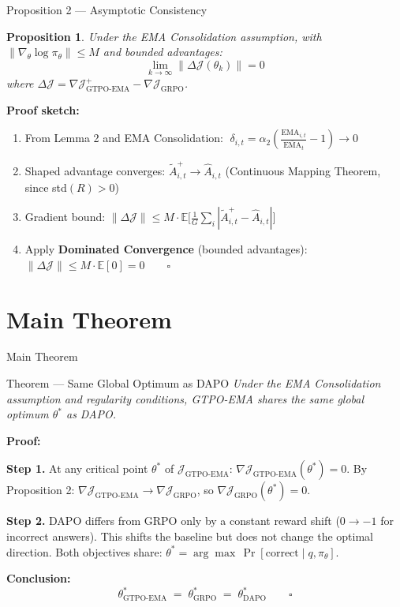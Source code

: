 \documentclass[aspectratio=169, 11pt]{beamer}
\newtheorem{proposition}{Proposition}
\newcommand{\EMA}{\mathrm{EMA}}
\newcommand{\GEMA}{\overline{\mathrm{EMA}}}
\newcommand{\Jgtpo}{\mathcal{J}_{\text{GTPO-EMA}}}
\newcommand{\Jgrpo}{\mathcal{J}_{\text{GRPO}}}
\begin{document}
\begin{frame}{Proposition 2 — Asymptotic Consistency}

\begin{proposition}
Under the EMA Consolidation assumption, with $\|\nabla_\theta \log \pi_\theta\| \leq M$
and bounded advantages:
\[
\lim_{k\to\infty} \|\Delta\mathcal{J}(\theta_k)\| = 0
\]
where $\Delta\mathcal{J} = \nabla\Jgtpo^+ - \nabla\Jgrpo$.
\end{proposition}

\textbf{Proof sketch:}
\begin{enumerate}
  \item From Lemma 2 and EMA Consolidation:
  $\;\delta_{i,t} = \alpha_2\!\left(\tfrac{\EMA_{i,t}}{\GEMA_t} - 1\right) \to 0$

  \item Shaped advantage converges: $\tilde{A}^+_{i,t} \to \hat{A}_{i,t}$
  (Continuous Mapping Theorem, since std$(R) > 0$)

  \item Gradient bound:
  $\|\Delta\mathcal{J}\| \leq M \cdot \mathbb{E}\bigl[\tfrac{1}{G}\sum_i |\tilde{A}^+_{i,t} - \hat{A}_{i,t}|\bigr]$

  \item Apply \textbf{Dominated Convergence} (bounded advantages):
  $\|\Delta\mathcal{J}\| \leq M \cdot \mathbb{E}[0] = 0 \qquad\square$
\end{enumerate}

\end{frame}

\section{Main Theorem}

\begin{frame}{Main Theorem}

\begin{block}{\large Theorem — Same Global Optimum as DAPO}
\emph{Under the EMA Consolidation assumption and regularity conditions,
GTPO-EMA shares the same global optimum $\theta^*$ as DAPO.}
\end{block}

\medskip
\textbf{Proof:}

\textbf{Step 1.} At any critical point $\theta^*$ of $\Jgtpo$:
$\nabla\Jgtpo(\theta^*) = 0$.
By Proposition 2: $\nabla\Jgtpo \to \nabla\Jgrpo$, so $\nabla\Jgrpo(\theta^*) = 0$.

\smallskip
\textbf{Step 2.} DAPO differs from GRPO only by a constant reward shift
($0 \to -1$ for incorrect answers). This shifts the baseline but does not
change the optimal direction. Both objectives share:
$\theta^* = \arg\max\, \Pr[\text{correct} \mid q, \pi_\theta]$.

\smallskip
\textbf{Conclusion:}
\[
\theta^*_{\text{GTPO-EMA}} \;=\; \theta^*_{\text{GRPO}} \;=\; \theta^*_{\text{DAPO}} \qquad\square
\]

\end{frame}
\end{document}
